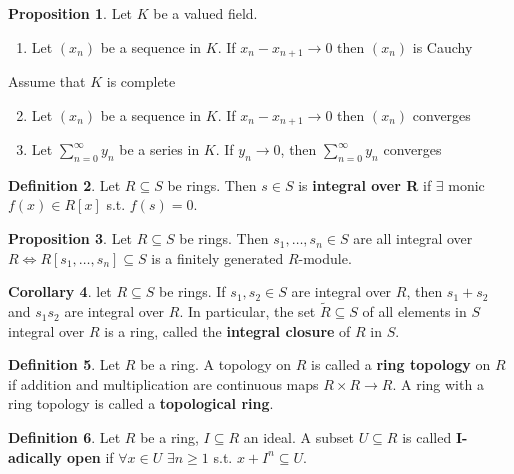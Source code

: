 \documentclass[a4paper]{article}
\theoremstyle{definition}
\newtheorem{definition}{Definition}
\theoremstyle{default}
\newtheorem{prop}[definition]{Proposition}
\newtheorem{corollary}[definition]{Corollary}
\theoremstyle{remark}
\begin{document}
\begin{prop}
	Let $K$ be a valued field.
	\begin{enumerate}[label=\roman*.]
		\item Let $(x_n)$ be a sequence in $K$.
		If $x_n - x_{n+1} \to 0$ then $(x_n)$ is Cauchy
	\end{enumerate}
	Assume that $K$ is complete
	\begin{enumerate}[label=\roman*.]
		\setcounter{enumi}{1}
		\item Let $(x_n)$ be a sequence in $K$.
		If $x_n - x_{n+1} \to 0$ then $(x_n)$ converges
		\item Let $\sum_{n=0}^{\infty}y_n$ be a series in $K$.
		If $y_n\to0$, then $\sum_{n=0}^{\infty}y_n$ converges
	\end{enumerate}
\end{prop}

\begin{definition}
	Let $R \subseteq S$ be rings.
	Then $s \in S$ is \textbf{integral over R} if $\exists$ monic $f(x) \in R[x]$ s.t. $f(s)=0$.
\end{definition}

\begin{prop}
	Let $R \subseteq S$ be rings.
	Then $s_1, \dots,s_n\in S$ are all integral over $R \iff R[s_1,\dots,s_n] \subseteq S$ is a finitely generated $R$-module.
\end{prop}

\begin{corollary}
	let $R \subseteq S$ be rings.
	If $s_1, s_2 \in S$ are integral over $R$, then $s_1+s_2$ and $s_1s_2$ are integral over $R$.
	In particular, the set $\tilde{R}\subseteq S$ of all elements in $S$ integral over $R$ is a ring,
	called the \textbf{integral closure} of $R$ in $S$.
\end{corollary}

\begin{definition}
	Let $R$ be a ring. A topology on $R$ is called a \textbf{ring topology} on $R$ if addition and multiplication are continuous maps $R\times R\to R$. A ring with a ring topology is called a \textbf{topological ring}.
\end{definition}

\begin{definition}
	Let $R$ be a ring, $I \subseteq R$ an ideal. A subset $U \subseteq R$ is called \linebreak \textbf{I-adically open} if $\forall x \in U$ $\exists n \geq 1$ s.t. $x + I^n \subseteq U$.
\end{definition}
\end{document}
